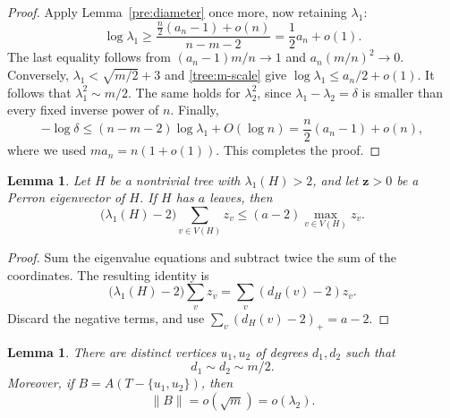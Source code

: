 \documentclass[11pt,a4paper]{article}
\numberwithin{equation}{section}
\newtheorem{lemma}[theorem]{Lemma}
\theoremstyle{definition}
\theoremstyle{remark}
\begin{document}
\begin{proof}
Apply Lemma~\ref{pre:diameter} once more, now retaining $\lambda_1$:
\[
 \log\lambda_1\geq
 \frac{\frac n2(a_n-1)+o(n)}{n-m-2}
 =\frac12a_n+o(1).
\]
The last equality follows from
$(a_n-1)m/n\to1$ and $a_n(m/n)^2\to0$.
Conversely, $\lambda_1<\sqrt{m/2}+3$ and
\eqref{tree:m-scale} give $\log\lambda_1\leq a_n/2+o(1)$.
It follows that $\lambda_1^2\sim m/2$. The same holds for
$\lambda_2^2$, since $\lambda_1-\lambda_2=\delta$ is smaller than
every fixed inverse power of $n$. Finally,
\[
 -\log\delta\leq(n-m-2)\log\lambda_1+O(\log n)
 =\frac n2(a_n-1)+o(n),
\]
where we used $ma_n=n(1+o(1))$. This completes the proof.
\end{proof}

\begin{lemma}\label{tree:mass}
Let $H$ be a nontrivial tree with $\lambda_1(H)>2$, and let
$\mathbf z>0$ be a Perron eigenvector of $H$. If $H$ has $a$ leaves,
then
\[
 \bigl(\lambda_1(H)-2\bigr)\sum_{v\in V(H)}z_v
 \leq(a-2)\max_{v\in V(H)}z_v.
\]
\end{lemma}

\begin{proof}
Sum the eigenvalue equations and subtract twice the sum of the
coordinates. The resulting identity is
\[
 \bigl(\lambda_1(H)-2\bigr)\sum_vz_v
 =\sum_v(d_H(v)-2)z_v.
\]
Discard the negative terms, and use
$\sum_v(d_H(v)-2)_+=a-2$.
\end{proof}

\begin{lemma}\label{tree:hubs}
There are distinct vertices $u_1,u_2$ of degrees $d_1,d_2$ such that
\begin{equation}\label{tree:hub-scales}
 d_1\sim d_2\sim m/2.
\end{equation}
Moreover, if $B=A(T-\{u_1,u_2\})$, then
\begin{equation}\label{tree:residual-small}
 \lVert B\rVert=o(\sqrt m)=o(\lambda_2).
\end{equation}
\end{lemma}
\end{document}
